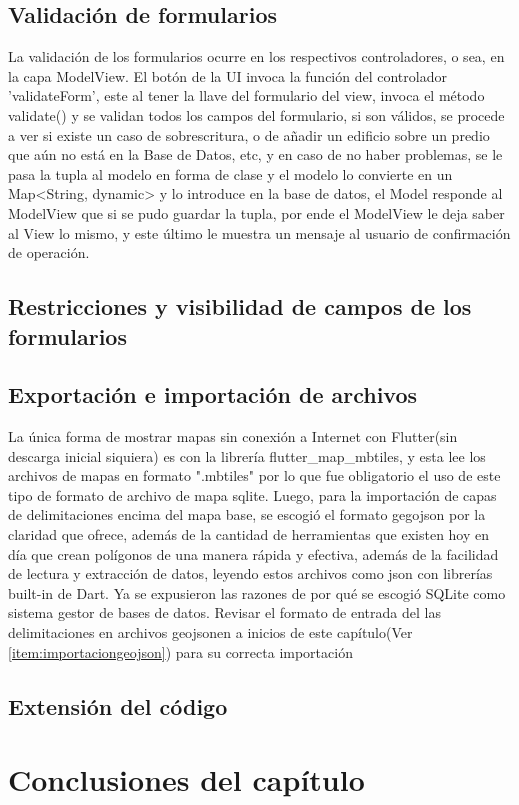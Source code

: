 \subsection{Validación de formularios}
La validación de los formularios ocurre en los respectivos controladores, o sea, en la capa ModelView. El botón de la UI invoca la función del controlador 'validateForm', este al tener la llave del formulario del view,
invoca el método validate() y se validan todos los campos del formulario, si son válidos, se procede a ver si existe un caso de sobrescritura, o de añadir un edificio sobre un predio que aún no está en la Base de Datos, etc,
y en caso de no haber problemas, se le pasa la tupla al modelo en forma de clase y el modelo lo convierte en un Map<String, dynamic> y lo introduce en la base de datos, el Model responde al ModelView que si se pudo guardar la tupla,
por ende el ModelView le deja saber al View lo mismo, y este último le muestra un mensaje al usuario de confirmación de operación.
\subsection{Restricciones y visibilidad de campos de los formularios}

\subsection{Exportación e importación de archivos}
La única forma de mostrar mapas sin conexión a Internet con Flutter(sin descarga inicial siquiera) es con la librería flutter\_map\_mbtiles, y esta lee los archivos de mapas en formato ".mbtiles" por lo que fue obligatorio el uso de este tipo de formato de archivo de mapa
sqlite. Luego, para la importación de capas de delimitaciones encima del mapa base, se escogió el formato gegojson por la claridad que ofrece, además de la cantidad de herramientas que existen hoy en día que crean polígonos
de una manera rápida y efectiva, además de la facilidad de lectura y extracción de datos, leyendo estos archivos como json con librerías built-in de Dart. Ya se expusieron las razones de por qué se escogió SQLite como sistema gestor de bases de datos.
Revisar el formato de entrada del las delimitaciones en archivos geojsonen a inicios de este capítulo(Ver \ref{item:importaciongeojson}) para su correcta importación
\subsection{Extensión del código}
\section{Conclusiones del capítulo}